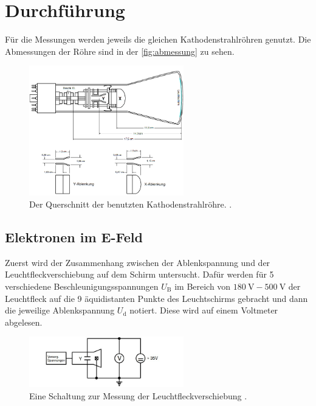 \section{Durchführung}
\label{sec:Durchführung}

Für die Messungen werden jeweils die gleichen Kathodenstrahlröhren genutzt. Die Abmessungen der Röhre sind in der \autoref{fig:abmessung} zu sehen.

\begin{figure}[H]
    \centering
    \includegraphics[width=0.6\textwidth]{bilder/abmessung_roehre.png}
    \caption{Der Querschnitt der benutzten Kathodenstrahlröhre. \cite{anleitung501}.}
    \label{fig:abmessung}
\end{figure}

\subsection{Elektronen im E-Feld}

    Zuerst wird der Zusammenhang zwischen der Ablenkspannung und der Leuchtfleckverschiebung auf dem Schirm untersucht. Dafür werden für 5 verschiedene 
    Beschleunigungsspannungen $U_{\text{B}}$ im Bereich von $\SI{180}{\volt} - \SI{500}{\volt}$ der Leuchtfleck auf die 9 äquidistanten Punkte des 
    Leuchtschirms gebracht und dann die jeweilige Ablenkspannung $U_{\text{d}}$ notiert. Diese wird auf einem Voltmeter abgelesen.

    \begin{figure}[H]
        \centering
        \includegraphics[width=0.6\textwidth]{bilder/messung_leuchtfleckverschiebung.jpg}
        \caption{Eine Schaltung zur Messung der Leuchtfleckverschiebung \cite{anleitung501}.}
        \label{fig:leuchtfleckverschiebung}
    \end{figure}

